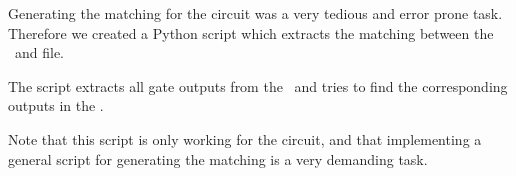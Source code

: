 Generating the matching for the  circuit was a very tedious and 
error prone task. Therefore we created a Python script which extracts the 
matching between the \spfile\ and  file.

The script extracts all gate outputs from the \spfile\ and tries to find the 
corresponding outputs in the .

Note that this script is only working for the  circuit, and 
that implementing a general script for generating the matching is a very 
demanding task.